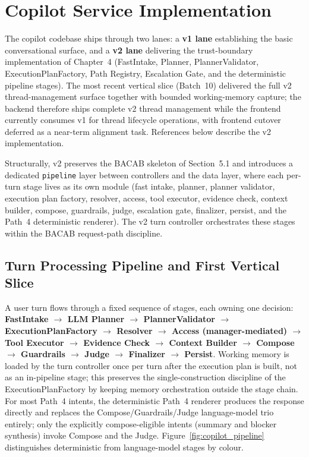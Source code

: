 \section{Copilot Service Implementation}
The copilot codebase ships through two lanes: a \textbf{v1 lane} establishing the basic conversational surface, and a \textbf{v2 lane} delivering the trust-boundary implementation of Chapter~4 (FastIntake, Planner, PlannerValidator, ExecutionPlanFactory, Path Registry, Escalation Gate, and the deterministic pipeline stages). The most recent vertical slice (Batch~10) delivered the full v2 thread-management surface together with bounded working-memory capture; the backend therefore ships complete v2 thread management while the frontend currently consumes v1 for thread lifecycle operations, with frontend cutover deferred as a near-term alignment task. References below describe the v2 implementation.

Structurally, v2 preserves the BACAB skeleton of Section~5.1 and introduces a dedicated \texttt{pipeline} layer between controllers and the data layer, where each per-turn stage lives as its own module (fast intake, planner, planner validator, execution plan factory, resolver, access, tool executor, evidence check, context builder, compose, guardrails, judge, escalation gate, finalizer, persist, and the Path~4 deterministic renderer). The v2 turn controller orchestrates these stages within the BACAB request-path discipline.

\subsection{Turn Processing Pipeline and First Vertical Slice}
A user turn flows through a fixed sequence of stages, each owning one decision: \textbf{FastIntake $\rightarrow$ LLM Planner $\rightarrow$ PlannerValidator $\rightarrow$ ExecutionPlanFactory $\rightarrow$ Resolver $\rightarrow$ Access (manager-mediated) $\rightarrow$ Tool Executor $\rightarrow$ Evidence Check $\rightarrow$ Context Builder $\rightarrow$ Compose $\rightarrow$ Guardrails $\rightarrow$ Judge $\rightarrow$ Finalizer $\rightarrow$ Persist}. Working memory is loaded by the turn controller once per turn after the execution plan is built, not as an in-pipeline stage; this preserves the single-construction discipline of the ExecutionPlanFactory by keeping memory orchestration outside the stage chain. For most Path~4 intents, the deterministic Path~4 renderer produces the response directly and replaces the Compose/Guardrails/Judge language-model trio entirely; only the explicitly compose-eligible intents (summary and blocker synthesis) invoke Compose and the Judge. Figure~\ref{fig:copilot_pipeline} distinguishes deterministic from language-model stages by colour.

